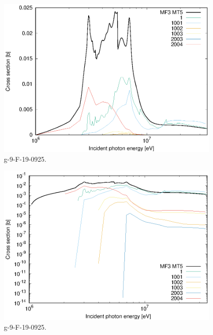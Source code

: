 \begin{figure}
 \includegraphics[width=\linewidth]{eps/g_9-F-19_0925.eps}
  \caption{g-9-F-19-0925.}
\end{figure}
\begin{figure}
 \includegraphics[width=\linewidth]{eps-log/g_9-F-19_0925.eps}
 \caption{g-9-F-19-0925.}
\end{figure}
\newpage \clearpage

